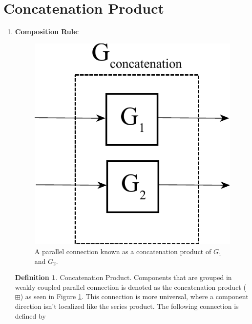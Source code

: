 \documentclass[a4paper]{article}
\theoremstyle{definition}
\newtheorem{definition}{Definition}[section]
\begin{document}
\section*{Concatenation Product}
\begin{enumerate}[label=(\roman*)]
\item
\textbf{Composition Rule}: 
\begin{figure}[H]
\centering
\includegraphics[width = 7.5 cm]{Concatenation_product.pdf}
\caption{A parallel connection known as a concatenation product of $G_1$ and $G_2$.
}
\label{fig:concatenation}
\end{figure}  


\theoremstyle{definition}
\begin{definition}{Concatenation Product.}
Components that are grouped in weakly coupled parallel connection is denoted as the concatenation product ($ \boxplus $) as seen in Figure \ref{fig:concatenation}. This connection is more universal, where a component direction isn't localized like the series product. The following connection is defined by




\end{definition}
\end{enumerate}
\end{document}
